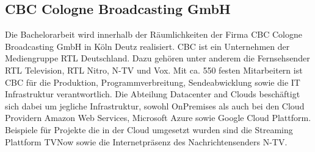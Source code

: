 \subsection{CBC Cologne Broadcasting GmbH}

Die Bachelorarbeit wird innerhalb der Räumlichkeiten der Firma CBC Cologne Broadcasting GmbH in Köln Deutz realisiert.
CBC ist ein Unternehmen der Mediengruppe RTL Deutschland. Dazu gehören unter anderem die Fernsehsender RTL Television, RTL Nitro, N-TV und Vox.
Mit ca. 550 festen Mitarbeitern ist CBC für die Produktion, Programmverbreitung, Sendeabwicklung sowie die IT Infrastruktur verantwortlich.
Die Abteilung Datacenter and Clouds beschäftigt sich dabei um jegliche Infrastruktur, sowohl OnPremises als auch bei den Cloud Providern Amazon Web Services,
Microsoft Azure sowie Google Cloud Plattform.
Beispiele für Projekte die in der Cloud umgesetzt wurden sind die Streaming Plattform TVNow sowie die Internetpräsenz des Nachrichtensenders N-TV.
